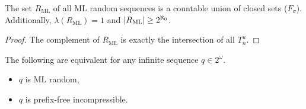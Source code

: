 \begin{corollary}
  The set $R_{\text{ML}}$ of all ML random sequences is a countable union of
  closed sets ($F_\sigma$).
  Additionally, $\lambda(R_{\text{ML}}) = 1$ and $\left| R_{\text{ML}} \right| \ge
  2^{\aleph_0}$.
\end{corollary}

\begin{proof}
  The complement of $R_{\text{ML}}$ is exactly the intersection of all $T_n^u$.
\end{proof}

\begin{theorem}
  The following are equivalent for any infinite sequence $q \in 2^\omega$.
  \begin{itemize}
  \item $q$ is ML random,
  \item $q$ is prefix-free incompressible.
  \end{itemize}
\end{theorem}

